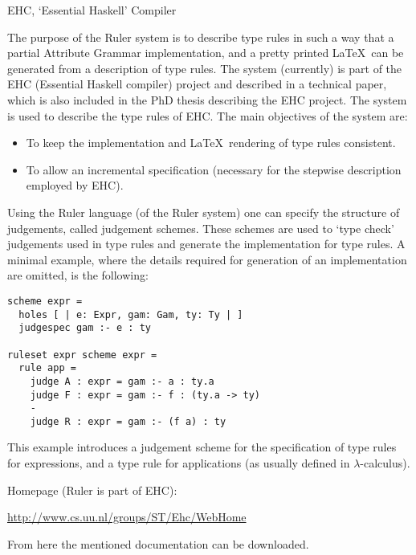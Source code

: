 \begin{hcarentry}{EHC, `Essential Haskell' Compiler}
\label{ruler}
% 
\makeheader

The purpose of the Ruler system is to describe type rules in such a way that a partial
Attribute Grammar implementation,
and a pretty printed \LaTeX\ can be generated from a description of type rules.
The system (currently) is part of the EHC (Essential Haskell compiler)
project and described in a technical paper,
which is also included in the PhD thesis describing the EHC project.
The system is used to describe the type rules of EHC.
The main objectives of the system are:
\begin{itemize}
\item To keep the implementation and \LaTeX\ rendering of type rules consistent.
\item To allow an incremental specification (necessary for the stepwise description employed by EHC).
\end{itemize}

Using the Ruler language (of the Ruler system) one can specify the structure of judgements, called
judgement schemes.
These schemes are used to `type check' judgements used in type rules and generate the implementation for type rules.
A minimal example, where the details required for generation of an implementation are omitted, is the following:
\begin{verbatim}
scheme expr =
  holes [ | e: Expr, gam: Gam, ty: Ty | ]
  judgespec gam :- e : ty

ruleset expr scheme expr =
  rule app =
    judge A : expr = gam :- a : ty.a
    judge F : expr = gam :- f : (ty.a -> ty)
    -
    judge R : expr = gam :- (f a) : ty
\end{verbatim}
This example introduces a judgement scheme for the specification of type rules for expressions,
and a type rule for applications (as usually defined in $\lambda$-calculus).

\FurtherReading
\begin{compactitem}
\item Homepage (Ruler is part of EHC):

\url{http://www.cs.uu.nl/groups/ST/Ehc/WebHome}

From here the mentioned documentation can be downloaded.

\end{compactitem}  
\end{hcarentry}
